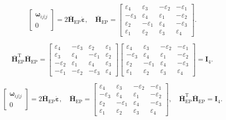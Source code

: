 \begin{equation}
    \begin{bmatrix}
        \bm{\omega}_{ij|j}\\
        0
    \end{bmatrix}
    = 2\bar{\bm{H}}_{\mathrm{EP}}\dot{\bm{\varepsilon}},\quad
    \bar{\bm{H}}_{\mathrm{EP}} = \begin{bmatrix}
        \varepsilon_4 & \varepsilon_3 & -\varepsilon_2 & -\varepsilon_1\\
        -\varepsilon_3 & \varepsilon_4 & \varepsilon_1 & -\varepsilon_2\\
        \varepsilon_2 & -\varepsilon_1 & \varepsilon_4 & -\varepsilon_3\\
        \varepsilon_1 & \varepsilon_2 & \varepsilon_3 & \varepsilon_4
    \end{bmatrix}.
\end{equation}

\begin{equation}
    \bar{\bm{H}}_{\mathrm{EP}}^{\mathrm{T}}\bar{\bm{H}}_{\mathrm{EP}} = \begin{bmatrix}
        \varepsilon_4 & -\varepsilon_3 & \varepsilon_2 & \varepsilon_1\\
        \varepsilon_3 & \varepsilon_4 & -\varepsilon_1 & \varepsilon_2\\
        -\varepsilon_2 & \varepsilon_1 & \varepsilon_4 & \varepsilon_3\\
        -\varepsilon_1 & -\varepsilon_2 & -\varepsilon_3 & \varepsilon_4
    \end{bmatrix}
    \begin{bmatrix}
        \varepsilon_4 & \varepsilon_3 & -\varepsilon_2 & -\varepsilon_1\\
        -\varepsilon_3 & \varepsilon_4 & \varepsilon_1 & -\varepsilon_2\\
        \varepsilon_2 & -\varepsilon_1 & \varepsilon_4 & -\varepsilon_3\\
        \varepsilon_1 & \varepsilon_2 & \varepsilon_3 & \varepsilon_4
    \end{bmatrix}
    = \bm{I}_4.
\end{equation}

\begin{equation}
    \begin{bmatrix}
        \bm{\omega}_{ij|j}\\
        0
    \end{bmatrix}
    = 2\bar{\bm{H}}_{\mathrm{EP}}\dot{\bm{\varepsilon}},\quad
    \bar{\bm{H}}_{\mathrm{EP}} = \begin{bmatrix}
        \varepsilon_4 & \varepsilon_3 & -\varepsilon_2 & -\varepsilon_1\\
        -\varepsilon_3 & \varepsilon_4 & \varepsilon_1 & -\varepsilon_2\\
        \varepsilon_2 & -\varepsilon_1 & \varepsilon_4 & -\varepsilon_3\\
        \varepsilon_1 & \varepsilon_2 & \varepsilon_3 & \varepsilon_4
    \end{bmatrix},\quad
    \bar{\bm{H}}_{\mathrm{EP}}^{\mathrm{T}}\bar{\bm{H}}_{\mathrm{EP}} = \bm{I}_4.
\end{equation}

